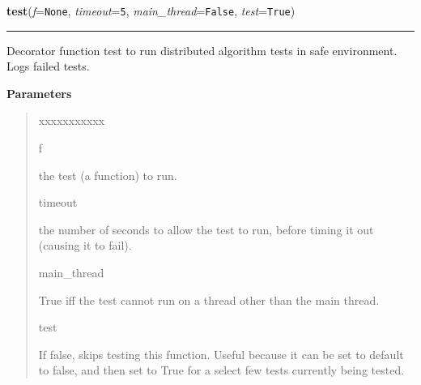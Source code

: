\hspace{.8\funcindent}\begin{boxedminipage}{\funcwidth}

    \raggedright \textbf{test}(\textit{f}={\tt None}, \textit{timeout}={\tt 5}, \textit{main\_thread}={\tt False}, \textit{test}={\tt True})

    \vspace{-1.5ex}

    \rule{\textwidth}{0.5\fboxrule}
\setlength{\parskip}{2ex}
    Decorator function test to run distributed algorithm tests in safe 
    environment. Logs failed tests.

\setlength{\parskip}{1ex}
      \textbf{Parameters}
      \vspace{-1ex}

      \begin{quote}
        \begin{Ventry}{xxxxxxxxxxx}

          \item[f]

          the test (a function) to run.

          \item[timeout]

          the number of seconds to allow the test to run, before timing it 
          out (causing it to fail).

          \item[main\_thread]

          True iff the test cannot run on a thread other than the main 
          thread.

          \item[test]

          If false, skips testing this function. Useful because it can be 
          set to default to false, and then set to True for a select few 
          tests currently being tested.

        \end{Ventry}

      \end{quote}

    \end{boxedminipage}

    \label{datk:core:tester:print_with_underline}

    \vspace{0.5ex}

